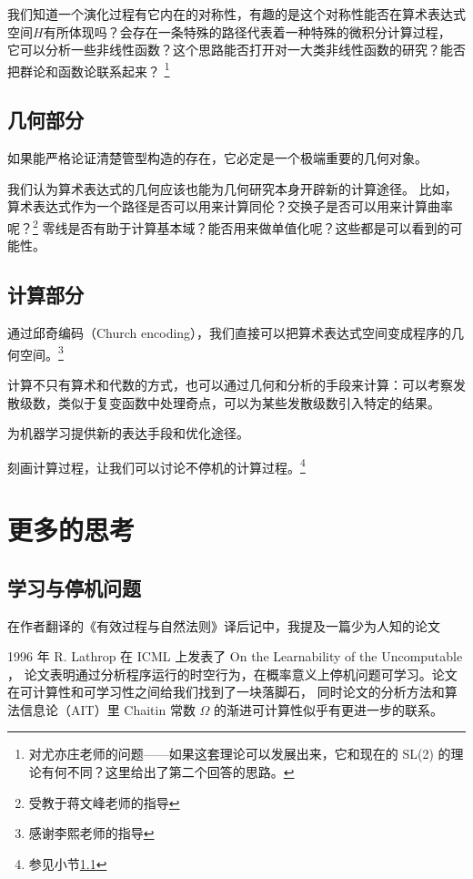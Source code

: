 \documentclass[a4paper,12pt]{article}
\numberwithin{problem}{section}
\numberwithin{definition}{section}
\numberwithin{lemma}{section}
\numberwithin{proposition}{section}
\numberwithin{theorem}{section}
\numberwithin{grammar}{section}
\numberwithin{program}{section}
\numberwithin{convention}{section}
\numberwithin{corollary}{section}
\begin{document}
我们知道一个演化过程有它内在的对称性，有趣的是这个对称性能否在算术表达式空间$H$有所体现吗？会存在一条特殊的路径代表着一种特殊的微积分计算过程，
它可以分析一些非线性函数？这个思路能否打开对一大类非线性函数的研究？能否把群论和函数论联系起来？
\footnote{对尤亦庄老师的问题——如果这套理论可以发展出来，它和现在的 SL(2) 的理论有何不同？这里给出了第二个回答的思路。}

\subsection{几何部分}

如果能严格论证清楚管型构造的存在，它必定是一个极端重要的几何对象。

我们认为算术表达式的几何应该也能为几何研究本身开辟新的计算途径。
比如，算术表达式作为一个路径是否可以用来计算同伦？交换子是否可以用来计算曲率呢？\footnote{受教于蒋文峰老师的指导}
零线是否有助于计算基本域？能否用来做单值化呢？这些都是可以看到的可能性。

\subsection{计算部分}

通过邱奇编码（Church encoding），我们直接可以把算术表达式空间变成程序的几何空间。\footnote{感谢李熙老师的指导}

计算不只有算术和代数的方式，也可以通过几何和分析的手段来计算：可以考察发散级数，类似于复变函数中处理奇点，可以为某些发散级数引入特定的结果。

为机器学习提供新的表达手段和优化途径。

刻画计算过程，让我们可以讨论不停机的计算过程。\footnote{参见小节\ref{sec:learnandhalt}}

\newpage

\section{更多的思考}

\subsection{学习与停机问题}\label{sec:learnandhalt}

在作者翻译的《有效过程与自然法则》译后记中，我提及一篇少为人知的论文

\begin{displayquote}
1996 年 R. Lathrop 在 ICML 上发表了 On the Learnability of the Uncomputable ，
论文表明通过分析程序运行的时空行为，在概率意义上停机问题可学习。论文在可计算性和可学习性之间给我们找到了一块落脚石，
同时论文的分析方法和算法信息论（AIT）里 Chaitin 常数 $\Omega$ 的渐进可计算性似乎有更进一步的联系。
\end{displayquote}
\end{document}
